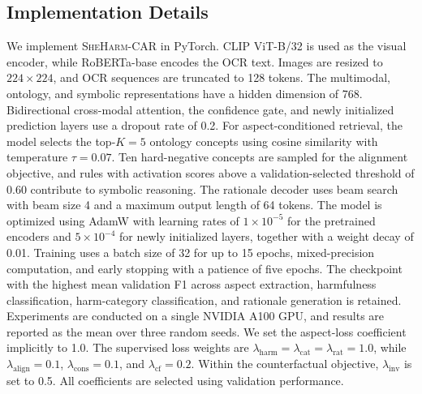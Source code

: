 \documentclass[11pt]{article}
\begin{document}
\subsection{Implementation Details}
\label{subsec:implementation}

We implement \textsc{SheHarm-CAR} in PyTorch. CLIP ViT-B/32 is used
as the visual encoder, while RoBERTa-base encodes the OCR text.
Images are resized to $224\times224$, and OCR sequences are truncated
to 128 tokens. The multimodal, ontology, and symbolic representations
have a hidden dimension of 768. Bidirectional cross-modal attention,
the confidence gate, and newly initialized prediction layers use a
dropout rate of 0.2. For aspect-conditioned retrieval, the model selects the top-$K=5$
ontology concepts using cosine similarity with temperature
$\tau=0.07$. Ten hard-negative concepts are sampled for the alignment objective, and rules with activation scores above a
validation-selected threshold of 0.60 contribute to symbolic
reasoning. The rationale decoder uses beam search with beam size 4
and a maximum output length of 64 tokens. The model is optimized using AdamW with learning rates of
$1\times10^{-5}$ for the pretrained encoders and
$5\times10^{-4}$ for newly initialized layers, together with a weight
decay of 0.01. Training uses a batch size of 32 for up to 15 epochs,
mixed-precision computation, and early stopping with a patience of
five epochs. The checkpoint with the highest mean validation F1 across
aspect extraction, harmfulness classification, harm-category
classification, and rationale generation is retained. Experiments are
conducted on a single NVIDIA A100 GPU, and results are reported as the
mean over three random seeds.
We set the aspect-loss coefficient implicitly to 1.0. The supervised
loss weights are
$\lambda_{\mathrm{harm}}=\lambda_{\mathrm{cat}}
=\lambda_{\mathrm{rat}}=1.0$, while
$\lambda_{\mathrm{align}}=0.1$,
$\lambda_{\mathrm{cons}}=0.1$, and
$\lambda_{\mathrm{cf}}=0.2$. Within the counterfactual objective,
$\lambda_{\mathrm{inv}}$ is set to 0.5. All coefficients are selected
using validation performance.
\end{document}
